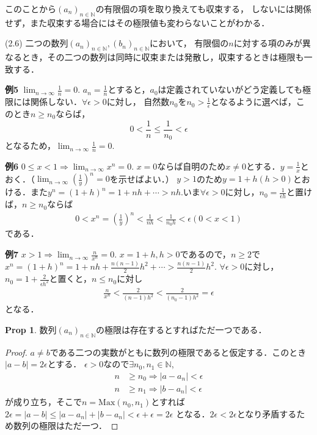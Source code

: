 \documentclass{ltjsarticle}
\theoremstyle{definition}
\newtheorem{prop}[thm]{Prop}
\theoremstyle{propcorollarystyle}
\theoremstyle{thmcorollarystyle}
\begin{document}
このことから$(a_n)_{n \in \mathbb{N}}$の有限個の項を取り換えても収束する，
しないには関係せず，また収束する場合にはその極限値も変わらないことがわかる．

 (2.6) 二つの数列$(a_n)_{n \in \mathbb{N}},(b_n)_{n \in \mathbb{N}}$において，
 有限個の$n$に対する項のみが異なるとき，その二つの数列は同時に収束または発散し，収束するときは極限も一致する．

\textbf{例5} $\lim_{n \rightarrow \infty} \frac{1}{n} = 0$.
$a_n=\frac{1}{n}$とすると，$a_0$は定義されていないがどう定義しても極限には関係しない．$\forall \epsilon>0$に対し，
自然数$n_0$を$n_0>\frac{1}{\epsilon}$となるように選べば，このとき$n\ge n_0$ならば，
\begin{equation*}
  0<\frac{1}{n}\le \frac{1}{n_0}<\epsilon
\end{equation*}
となるため，$\lim_{n \rightarrow \infty} \frac{1}{n}=0$.

\textbf{例6} $0 \le x < 1 \Rightarrow \lim_{n \rightarrow \infty} x^n =0$.
$x=0$ならば自明のため$x \neq 0$とする．$y=\frac{1}{x}$とおく．（$\lim_{n \rightarrow \infty} (\frac{1}{y})^n = 0$を示せばよい．）
$y>1$のため$y=1+h (h>0)$とおける．また$y^n = (1+h)^n = 1+nh+\cdots > nh.$いま$\forall \epsilon >0$に対し，$n_0=\frac{1}{\epsilon h}$と置けば，$n \ge n_0$ならば
\begin{align*}
  0 < x^n =(\frac{1}{y})^n < \frac{1}{nh} < \frac{1}{n_{0}h} <\epsilon (0 < x < 1)
\end{align*}
である．

\textbf{例7} $x>1 \Rightarrow \lim_{n \rightarrow \infty} \frac{n}{x^n} = 0.$
$x=1+h,h>0$であるので，$n \ge 2$で$x^n=(1+h)^n=1+nh+\frac{n(n-1)}{2}h^2+\cdots>\frac{n(n-1)}{2}h^2$.
$\forall \epsilon >0$に対し，$n_0=1+\frac{2}{\epsilon h^2}$と置くと，$n \le n_0$に対し
\begin{align*}
  \frac{n}{x^n} < \frac{2}{(n-1)h^2} < \frac{2}{(n_0-1)h^2} =\epsilon
\end{align*}
となる．

\begin{prop}
  数列$(a_n)_{n \in \mathbb{N}}$の極限は存在するとすればただ一つである．
\end{prop}
\begin{proof}
  $a \neq b$である二つの実数がともに数列の極限であると仮定する．このとき$|a-b|=2\epsilon$とする．
  $\epsilon > 0$なので$\exists n_0,n_1 \in \mathbb{N}$,
  \begin{align*}
    n &\ge n_0 \Rightarrow |a-a_n|<\epsilon \\
    n &\ge n_1 \Rightarrow |b-a_n|<\epsilon
  \end{align*}
  が成り立ち，そこで$n = \text{Max}(n_0,n_1)$とすれば$2\epsilon =|a-b| \le |a-a_n|+|b-a_n| <\epsilon + \epsilon=2\epsilon$
  となる．$2\epsilon<2\epsilon$となり矛盾するため数列の極限はただ一つ．
\end{proof}
\end{document}
